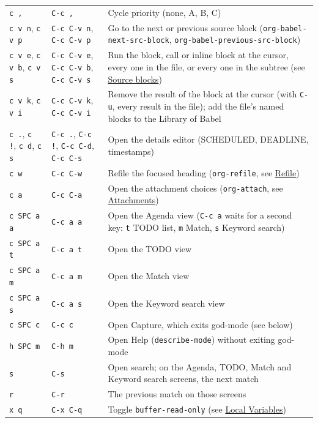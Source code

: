 \documentclass[11pt]{article}
\begin{document}
\begin{center}
\begin{tabular}{lll}
\texttt{c ,} & \texttt{C-c ,} & Cycle priority (none, A, B, C)\\[0pt]
\texttt{c v n}, \texttt{c v p} & \texttt{C-c C-v n}, \texttt{C-c C-v p} & Go to the next or previous source block (\texttt{org-babel-next-src-block}, \texttt{org-babel-previous-src-block})\\[0pt]
\texttt{c v e}, \texttt{c v b}, \texttt{c v s} & \texttt{C-c C-v e}, \texttt{C-c C-v b}, \texttt{C-c C-v s} & Run the block, call or inline block at the cursor, every one in the file, or every one in the subtree (see \hyperref[sec:org2fd54e4]{Source blocks})\\[0pt]
\texttt{c v k}, \texttt{c v i} & \texttt{C-c C-v k}, \texttt{C-c C-v i} & Remove the result of the block at the cursor (with \texttt{C-u}, every result in the file); add the file's named blocks to the Library of Babel\\[0pt]
\texttt{c .}, \texttt{c !}, \texttt{c d}, \texttt{c s} & \texttt{C-c .}, \texttt{C-c !}, \texttt{C-c C-d}, \texttt{C-c C-s} & Open the details editor (SCHEDULED, DEADLINE, timestamps)\\[0pt]
\texttt{c w} & \texttt{C-c C-w} & Refile the focused heading (\texttt{org-refile}, see \hyperref[sec:orgf424d46]{Refile})\\[0pt]
\texttt{c a} & \texttt{C-c C-a} & Open the attachment choices (\texttt{org-attach}, see \hyperref[sec:org970e59b]{Attachments})\\[0pt]
\texttt{c SPC a a} & \texttt{C-c a a} & Open the Agenda view (\texttt{C-c a} waits for a second key: \texttt{t} TODO list, \texttt{m} Match, \texttt{s} Keyword search)\\[0pt]
\texttt{c SPC a t} & \texttt{C-c a t} & Open the TODO view\\[0pt]
\texttt{c SPC a m} & \texttt{C-c a m} & Open the Match view\\[0pt]
\texttt{c SPC a s} & \texttt{C-c a s} & Open the Keyword search view\\[0pt]
\texttt{c SPC c} & \texttt{C-c c} & Open Capture, which exits god-mode (see below)\\[0pt]
\texttt{h SPC m} & \texttt{C-h m} & Open Help (\texttt{describe-mode}) without exiting god-mode\\[0pt]
\texttt{s} & \texttt{C-s} & Open search; on the Agenda, TODO, Match and Keyword search screens, the next match\\[0pt]
\texttt{r} & \texttt{C-r} & The previous match on those screens\\[0pt]
\texttt{x q} & \texttt{C-x C-q} & Toggle \texttt{buffer-read-only} (see \hyperref[sec:org761a631]{Local Variables})\\[0pt]

\end{tabular}
\end{center}
\end{document}
